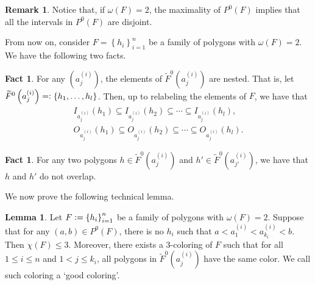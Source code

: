 \documentclass[12pt]{article}
\theoremstyle{definition}
\newtheorem{lemma}[thm]{Lemma}
\newtheorem{rmk}[thm]{Remark}
\newtheorem{fact}[thm]{Fact}
\newcommand{\defeq}{\vcentcolon=}
\newcommand{\eqdef}{=\vcentcolon}
\begin{document}
     \begin{rmk}
         Notice that, if 
         $\omega\left(F\right) = 2$,
         the maximality of
         $P^{0}\left(F\right)$ 
         implies that all the
         intervals in $P^{0}\left(F\right)$
         are disjoint.
     \end{rmk}

     From now on, consider
     $F = \left\{h_{i}\right\}_{i = 1}^{n}$ 
     be a family of polygons
     with $\omega\left(F\right)=2$.
     We have the following two facts.

     \begin{fact}
         For any $\left(a_{j}^{\left(i\right)}\right)$,
         the elements of
         $\widetilde{F}^{0}\left(a_{j}^{\left(i\right)}\right)$ 
         are nested. That is, let
             $\widetilde{F}^{0}\left(a_{j}^{\left(i\right)}\right) 
             \eqdef \left\{h_1, \ldots, h_{l}\right\}$.
         Then, up to relabeling
         the elements of $F$, we have that
         \begin{gather*}
             I_{a_{j}^{\left(i\right)}}\left(h_1\right)
             \subseteq I_{a_{j}^{\left(i\right)}}\left(h_2\right)
             \subseteq \cdots
             \subseteq I_{a_{j}^{\left(i\right)}}\left(h_{l}\right), \\
             O_{a_{j}^{\left(i\right)}}\left(h_1\right)
             \subseteq O_{a_{j}^{\left(i\right)}}\left(h_2\right)
             \subseteq \cdots
             \subseteq O_{a_{j}^{\left(i\right)}}\left(h_{l}\right).
         \end{gather*}
     \end{fact}
     
     \begin{fact}
         For any two polygons
         $h \in \widetilde{F}^{0}\left(a_{j}^{\left(i\right)}\right)$ 
         and 
         $h' \in \widetilde{F}^{0}\left(a_{j'}^{\left(i\right)}\right)$, 
         we have that $h$ and $h'$
         do not overlap.    
     \end{fact}

     We now prove the following
     technical lemma.

     \begin{lemma} \label{lemma:poly}
         Let $F \defeq \left\{h_{i}\right\}_{i =1}^{n}$ 
         be a family of polygons with
         $\omega\left(F\right) = 2$.
         Suppose that for any
         $\left(a, b\right) \in P^{0}\left(F\right)$,
         there is no $h_{i}$ such
         that $a < a_1^{\left(i\right)}
         < a_{k_{i}}^{\left(i\right)} < b$.
         Then $\chi\left(F\right) \leq 3$.
         Moreover, there exists
         a 3-coloring of $F$ such
         that for all $1 \leq i \leq n$
         and $1 < j \leq k_{i}$,
         all polygons in
         $\widetilde{F}^{0}\left(a_{j}^{\left(i\right)}\right)$
         have the same color.
         We call such coloring a
         `good coloring'.
     \end{lemma}
\end{document}
